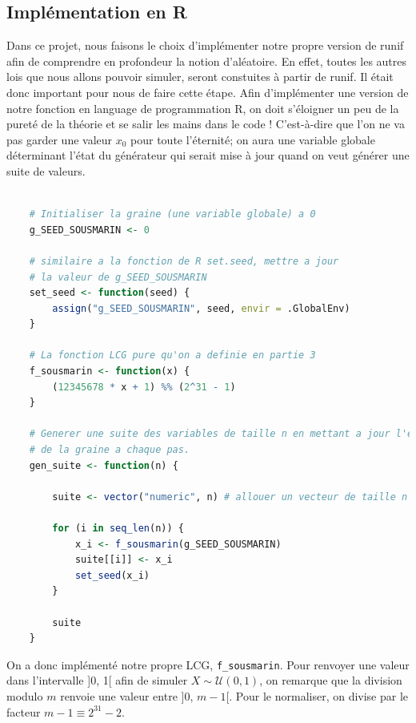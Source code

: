 \documentclass[10pt]{article} %
\begin{document}
\subsection{Implémentation en R}
Dans ce projet, nous faisons le choix d'implémenter notre propre version de runif afin de comprendre en profondeur la notion d'aléatoire. En effet, toutes les autres lois que nous allons pouvoir simuler, seront constuites à partir de runif. Il était donc important pour nous de faire cette étape. Afin d'implémenter une version de notre fonction en language de programmation R, on doit s'éloigner un peu de la pureté de la théorie et se salir les mains dans le code ! C'est-à-dire que l'on ne va pas garder une valeur $x_0$
pour toute l'éternité; on aura une variable globale déterminant l'état du générateur qui serait mise à jour quand on veut générer une suite de valeurs.


\begin{lstlisting}[language =R]

    # Initialiser la graine (une variable globale) a 0
    g_SEED_SOUSMARIN <- 0

    # similaire a la fonction de R set.seed, mettre a jour
    # la valeur de g_SEED_SOUSMARIN
    set_seed <- function(seed) {
        assign("g_SEED_SOUSMARIN", seed, envir = .GlobalEnv)
    }

    # La fonction LCG pure qu'on a definie en partie 3
    f_sousmarin <- function(x) {
        (12345678 * x + 1) %% (2^31 - 1)
    }

    # Generer une suite des variables de taille n en mettant a jour l'etat
    # de la graine a chaque pas.
    gen_suite <- function(n) {

        suite <- vector("numeric", n) # allouer un vecteur de taille n

        for (i in seq_len(n)) {
            x_i <- f_sousmarin(g_SEED_SOUSMARIN)
            suite[[i]] <- x_i
            set_seed(x_i)
        }

        suite
    }
\end{lstlisting}

On a donc implémenté notre propre LCG, \texttt{f\_sousmarin}. Pour renvoyer une valeur dans l'intervalle ]0, 1[ afin de simuler $X \sim \mathcal{U}(0, 1)$, on remarque que
la division modulo $m$ renvoie une valeur entre ]0, $m - 1$[. Pour le normaliser, on divise par le facteur $m - 1 \equiv 2^{31} - 2$.
\end{document}
